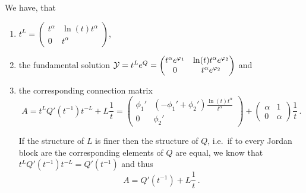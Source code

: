\begin{lem}
  We have, that 
  \begin{enumerate}
    \item $t^L=
      \begin{pmatrix}
        t^\alpha & \ln(t)t^\alpha \\ 0 & t^\alpha
      \end{pmatrix}$,
    \item the fundamental solution $\mathcal{Y}=t^Le^Q=
      \begin{pmatrix}
        t^\alpha e^{\varphi_1} & \ln(t)t^\alpha e^{\varphi_2}
        \\0 & t^\alpha e^{\varphi_2}
      \end{pmatrix}$ and
    \item the corresponding connection matrix
      \[
        A=t^LQ'(t^{-1})t^{-L}+L\frac{1}{t}=
        \begin{pmatrix}
          \phi_1' & (-\phi_1'+\phi_2')\frac{\ln(t)t^\alpha}{t^\alpha}
          \\0 & \phi_2'
        \end{pmatrix} 
        +
        \begin{pmatrix} \alpha & 1 \\ 0 & \alpha \end{pmatrix} \frac{1}{t} \,.
      \]
      \begin{s-rem}
        If the structure of $L$ is finer then the structure of $Q$, i.e.\ if to
        every Jordan block are the corresponding elements of $Q$ are equal, we
        know that $t^LQ'(t^{-1})t^{-L}=Q'(t^{-1})$ and thus
        \[
          A=Q'(t^{-1})+L\frac{1}{t} \,.
        \]
      \end{s-rem}
  \end{enumerate}
\end{lem}
